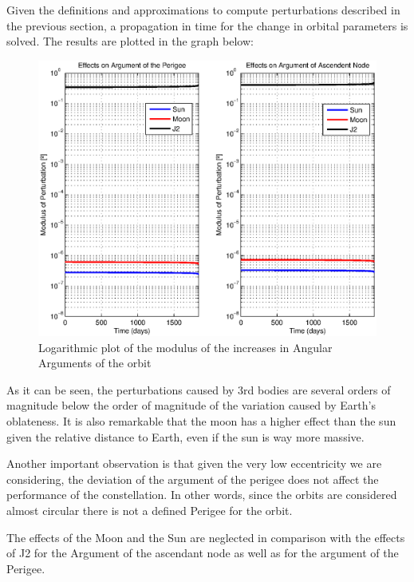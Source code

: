 Given the definitions and approximations to compute perturbations described in the previous section, a propagation in time for the change in orbital parameters is solved. The results are plotted in the graph below:

\begin{figure}[H]
\centering
\includegraphics[scale=0.8]{SignificativePerturbations/ModulusAngulars.eps}
\caption{Logarithmic plot of the modulus of the increases in Angular Arguments of the orbit}
\end{figure}

As it can be seen, the perturbations caused by 3rd bodies are several orders of magnitude below the order of magnitude of the variation caused by Earth's oblateness. It is also remarkable that the moon has a higher effect than the sun given the relative distance to Earth, even if the sun is way more massive.

Another important observation is that given the very low eccentricity we are considering, the deviation of the argument of the perigee does not affect the performance of the constellation. In other words, since the orbits are considered almost circular there is not a defined Perigee for the orbit.

The effects of the Moon and the Sun are neglected in comparison with the effects of J2 for the Argument of the ascendant node as well as for the argument of the Perigee.